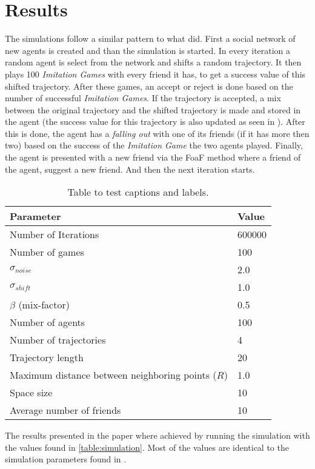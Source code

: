 \section{Results}
The simulations follow a similar pattern to what \cite{de2010multi} did.
First a social network of new agents is created and than the simulation is started.
In every iteration a random agent is select from the network and shifts a random trajectory.
It then plays 100 \textit{Imitation Games} with every friend it has, to get a success value of this shifted trajectory.
After these games, an accept or reject is done based on the number of successful \textit{Imitation Games}.
If the trajectory is accepted, a mix between the original trajectory and the shifted trajectory is made and stored in the agent (the success value for this trajectory is also updated as seen in \citep{de2010multi}).
After this is done, the agent has a \textit{falling out} with one of its friends (if it has more then two) based on the success of the \textit{Imitation Game} the two agents played.
Finally, the agent is presented with a new friend via the FoaF method where a friend of the agent, suggest a new friend.
And then the next iteration starts.

\begin{table}[t]
    \centering
    \begin{tabular}{ll}
    \hline
    Parameter                                         & Value  \\ \hline
    Number of Iterations                              & 600000 \\
    Number of games                                   & 100    \\
    $\sigma_{noise}$                                  & 2.0    \\
    $\sigma_{shift}$                                  & 1.0    \\
    $\beta$ (mix-factor)                              & 0.5    \\
    Number of agents                                  & 100    \\
    Number of trajectories                            & 4      \\
    Trajectory length                                 & 20     \\
    Maximum distance between neighboring points ($R$) & 1.0    \\
    Space size                                        & 10     \\
    Average number of friends                         & 10    
\end{tabular}
    \caption{Table to test captions and labels.}
    \label{table:simulation}
\end{table}

The results presented in the paper where achieved by running the simulation with the values found in \autoref{table:simulation}.
Most of the values are identical to the simulation parameters found in \citep*{de2010multi}.


